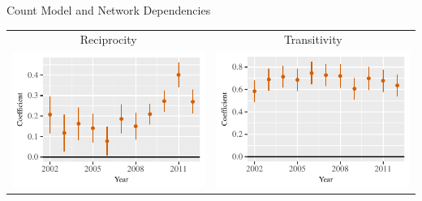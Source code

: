\documentclass{beamer}
\begin{document}
\begin{frame}{Count Model and Network Dependencies}

\centering
\begin{tabular}{c@{\hskip -.4cm}c}
\small{Reciprocity} & \small{Transitivity} \\ 
\includegraphics[height=.4\textheight, clip=true, trim=0cm .5cm .1cm .1cm]{slides_figures/rl_plots/Mutuality.pdf}   &
\includegraphics[height=.4\textheight, clip=true, trim=.5cm .5cm .6cm .1cm]{slides_figures/rl_plots/Transitivity.pdf} \\  
\end{tabular}



\end{frame}
\end{document}
